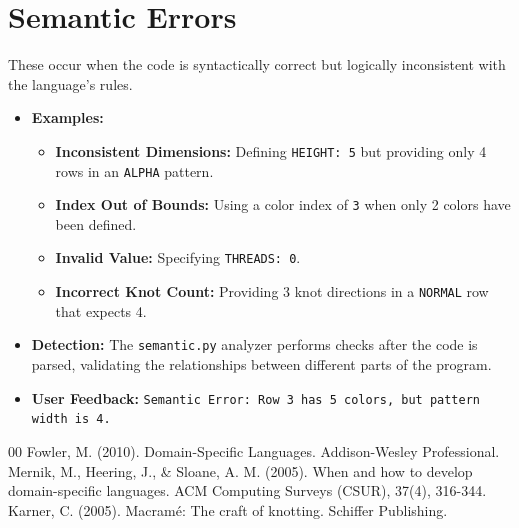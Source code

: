 \documentclass[12pt,a4paper]{report}
\begin{document}
\section{Semantic Errors}
These occur when the code is syntactically correct but logically inconsistent with the language's rules.
\begin{itemize}
    \item \textbf{Examples:}
    \begin{itemize}
        \item \textbf{Inconsistent Dimensions:} Defining \texttt{HEIGHT: 5} but providing only 4 rows in an \texttt{ALPHA} pattern.
        \item \textbf{Index Out of Bounds:} Using a color index of \texttt{3} when only 2 colors have been defined.
        \item \textbf{Invalid Value:} Specifying \texttt{THREADS: 0}.
        \item \textbf{Incorrect Knot Count:} Providing 3 knot directions in a \texttt{NORMAL} row that expects 4.
    \end{itemize}
    \item \textbf{Detection:} The \texttt{semantic.py} analyzer performs checks after the code is parsed, validating the relationships between different parts of the program.
    \item \textbf{User Feedback:} \texttt{Semantic Error: Row 3 has 5 colors, but pattern width is 4.}
\end{itemize}

\begin{thebibliography}{00}
 Fowler, M. (2010). Domain-Specific Languages. Addison-Wesley Professional.
 Mernik, M., Heering, J., \& Sloane, A. M. (2005). When and how to develop domain-specific languages. ACM Computing Surveys (CSUR), 37(4), 316-344.
 Karner, C. (2005). Macramé: The craft of knotting. Schiffer Publishing.
\end{thebibliography}
\end{document}
